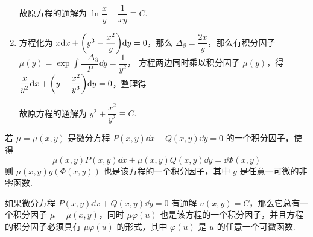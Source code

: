 \begin{solution}
\begin{enumerate}[label=(\arabic{*})]
              故原方程的通解为 $\ln\dfrac{x}{y}-\dfrac{1}{xy}\equiv C.$
        \item 方程化为 $x\dd x+\qty(y^3-\dfrac{x^2}{y})\dd y=0$，那么 $\Delta_\partial=\dfrac{2x}{y}$，那么有积分因子 $\mu(y)=\exp\displaystyle\int\dfrac{-\Delta_\partial}{P}\dd y=\dfrac{1}{y^2}$，
              方程两边同时乘以积分因子 $\mu(y)$，得 $\dfrac{x}{y^2}\dd x+\qty(y-\dfrac{x^2}{y^3})\dd y=0$，整理得
              故原方程的通解为 $y^2+\dfrac{x^2}{y^2}\equiv C.$
    \end{enumerate}
\end{solution}

\begin{theorem}
    若 $\mu=\mu(x,y)$ 是微分方程 $P(x,y)\dd x+Q(x,y)\dd y=0$ 的一个积分因子，使得
    $$\mu(x,y)P(x,y)\dd x+\mu(x,y)Q(x,y)\dd y=\dd \Phi(x,y)$$
    则 $\mu(x,y)g(\Phi(x,y))$ 也是该方程的一个积分因子，其中 $g$ 是任意一可微的非零函数.
\end{theorem}
\begin{theorem}[积分因子的存在性定理]
    如果微分方程 $P(x,y)\dd x+Q(x,y)\dd y=0$ 有通解 $u(x,y)=C$，那么它总有一个积分因子 $\mu=\mu(x,y)$，同时 $\mu\varphi(u)$ 也是该方程的一个积分因子，并且方程的积分因子必须具有 $\mu\varphi(u)$ 的形式，其中 $\varphi(u)$ 是 $u$ 的任意一个可微函数.
\end{theorem}

